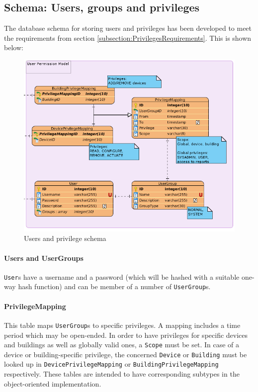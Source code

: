 \subsection{Schema: Users, groups and privileges}

The database schema for storing users and privileges has been developed to meet the requirements from section \ref{subsection:PrivilegesRequirements}. This is shown below:

\begin{figure}[H]
    \centering
    \includegraphics[width=\textwidth]{figures/db_user_schema}
    \caption{Users and privilege schema}
\end{figure}

\paragraph{Users and UserGroups}
\texttt{User}s have a username and a password (which will be hashed with a suitable one-way hash function) and can be member of a number of \texttt{UserGroup}s. 

\paragraph{PrivilegeMapping}
This table maps \texttt{UserGroup}s to specific privileges. A mapping includes a time period which may be open-ended. In order to have privileges for specific devices and buildings as well as globally valid ones, a \texttt{Scope} must be set. In case of a device or building-specific privilege, the concerned \texttt{Device} or \texttt{Building} must be looked up in \texttt{DevicePrivilegeMapping} or \texttt{BuildingPrivilegeMapping} respectively. These tables are intended to have corresponding subtypes in the object-oriented implementation.

